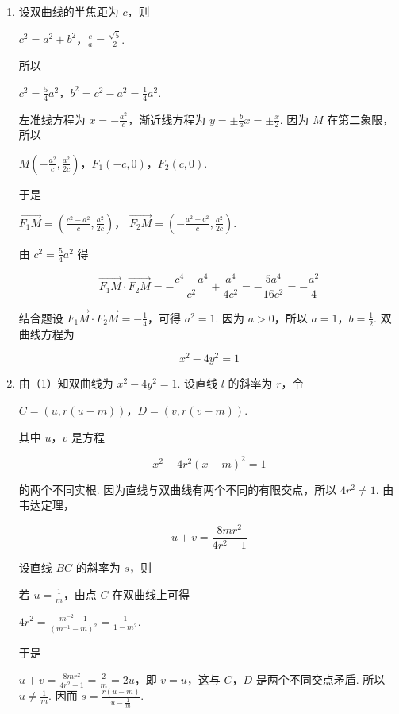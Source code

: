 \begin{solution}
\begin{enumerate}
\item 设双曲线的半焦距为 \(c\)，则

\(c^{2}=a^{2}+b^{2}\)，\(\frac{c}{a}=\frac{\sqrt{5}}{2}\).

所以

\(c^{2}=\frac{5}{4}a^{2}\)，\(b^{2}=c^{2}-a^{2}=\frac{1}{4}a^{2}\).

左准线方程为 \(x=-\frac{a^{2}}{c}\)，渐近线方程为 \(y=\pm\frac{b}{a}x=\pm\frac{x}{2}\). 因为 \(M\) 在第二象限，所以

\(M\left(-\frac{a^{2}}{c},\frac{a^{2}}{2c}\right)\)，\(F_1(-c,0)\)，\(F_2(c,0)\).

于是

\(\overrightarrow{F_1M}=\left(\frac{c^{2}-a^{2}}{c},\frac{a^{2}}{2c}\right)\)，
\(\overrightarrow{F_2M}=\left(-\frac{a^{2}+c^{2}}{c},\frac{a^{2}}{2c}\right)\).

由 \(c^{2}=\frac{5}{4}a^{2}\) 得

\[
\overrightarrow{F_1M}\cdot\overrightarrow{F_2M}=-\frac{c^{4}-a^{4}}{c^{2}}+\frac{a^{4}}{4c^{2}}=-\frac{5a^{4}}{16c^{2}}=-\frac{a^{2}}{4}
\]

结合题设 \(\overrightarrow{F_1M}\cdot\overrightarrow{F_2M}=-\frac{1}{4}\)，可得 \(a^{2}=1\). 因为 \(a>0\)，所以 \(a=1\)，\(b=\frac{1}{2}\). 双曲线方程为

\[
x^{2}-4y^{2}=1
\]

\item 由（1）知双曲线为 \(x^{2}-4y^{2}=1\). 设直线 \(l\) 的斜率为 \(r\)，令

\(C=(u,r(u-m))\)，\(D=(v,r(v-m))\).

其中 \(u\)，\(v\) 是方程

\[
x^{2}-4r^{2}(x-m)^{2}=1
\]

的两个不同实根. 因为直线与双曲线有两个不同的有限交点，所以 \(4r^{2}\ne1\). 由韦达定理，

\[
u+v=\frac{8mr^{2}}{4r^{2}-1}
\]

设直线 \(BC\) 的斜率为 \(s\)，则

若 \(u=\frac{1}{m}\)，由点 \(C\) 在双曲线上可得

\(4r^{2}=\frac{m^{-2}-1}{(m^{-1}-m)^{2}}=\frac{1}{1-m^{2}}\).

于是

\(u+v=\frac{8mr^{2}}{4r^{2}-1}=\frac{2}{m}=2u\)，即 \(v=u\)，这与 \(C\)，\(D\) 是两个不同交点矛盾. 所以 \(u\ne\frac{1}{m}\). 因而
\(s=\frac{r(u-m)}{u-\frac{1}{m}}\).


\end{enumerate}
\end{solution}

